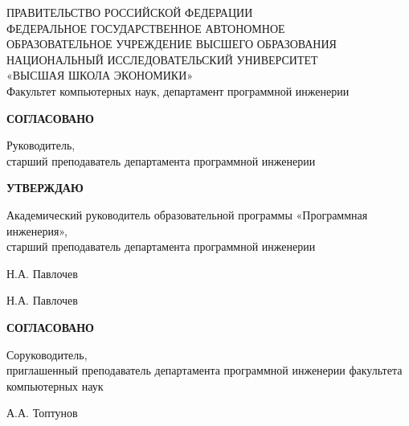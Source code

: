     ПРАВИТЕЛЬСТВО РОССИЙСКОЙ ФЕДЕРАЦИИ \\
    ФЕДЕРАЛЬНОЕ ГОСУДАРСТВЕННОЕ АВТОНОМНОЕ \\
    ОБРАЗОВАТЕЛЬНОЕ УЧРЕЖДЕНИЕ ВЫСШЕГО ОБРАЗОВАНИЯ \\
    НАЦИОНАЛЬНЫЙ ИССЛЕДОВАТЕЛЬСКИЙ УНИВЕРСИТЕТ \\
    «ВЫСШАЯ ШКОЛА ЭКОНОМИКИ» \\[1\baselineskip]
    Факультет компьютерных наук, департамент программной инженерии
\vskip 1.5cm
    \begin{varwidth}[t]{0.45\textwidth}\centering
    	\textbf{СОГЛАСОВАНО}
    	
    	Руководитель, \\
    	старший преподаватель департамента
        программной инженерии
    \end{varwidth}%
    \hfil%
    \begin{varwidth}[t]{0.45\textwidth}\centering
    	\textbf{УТВЕРЖДАЮ}
    	
    	Академический руководитель
        образовательной программы
        «Программная инженерия», \\
        старший преподаватель департамента
        программной инженерии
    \end{varwidth}

\bigskip

    \begin{varwidth}[t]{0.4\textwidth}\centering
    	\placename Н.А. Павлочев \\
    	\placedate
    \end{varwidth}%
    \hfil%
    \begin{varwidth}[t]{0.4\textwidth}\centering
    	\placename Н.А. Павлочев \\
    	\placedate
    \end{varwidth}

\bigskip

    \begin{minipage}[t]{0.45\textwidth}\centering
    	\textbf{СОГЛАСОВАНО}
    	
    	Соруководитель, \\
    	приглашенный преподаватель
        департамента программной инженерии
        факультета компьютерных наук
    \end{minipage}%
    \hfil\makebox[0.45\textwidth]{}

\bigskip

    \begin{minipage}[t]{0.45\textwidth}\centering
    	\placename А.А. Топтунов \\
    	\placedate
    \end{minipage}%
    \hfil\makebox[0.45\textwidth]{}

